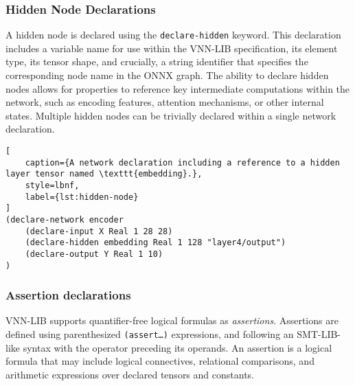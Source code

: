 \subsubsection*{Hidden Node Declarations}
\label{sec:hidden-node-declarations}
A hidden node is declared using the \texttt{declare-hidden} keyword. This declaration includes a variable name for use within the VNN-LIB specification, 
its element type, its tensor shape, and crucially, a string identifier that specifies the corresponding node name in the ONNX graph. The ability to declare hidden nodes
allows for properties to reference key intermediate computations within the network, such as encoding features, attention mechanisms, or other internal states. Multiple
hidden nodes can be trivially declared within a single network declaration.

\begin{lstlisting}[
    caption={A network declaration including a reference to a hidden layer tensor named \texttt{embedding}.}, 
    style=lbnf,
    label={lst:hidden-node}
]
(declare-network encoder
    (declare-input X Real 1 28 28)
    (declare-hidden embedding Real 1 128 "layer4/output")
    (declare-output Y Real 1 10)
)
\end{lstlisting}

\subsubsection*{Assertion declarations}
\label{sec:assertion-declarations}
VNN-LIB supports quantifier-free logical formulas as \textit{assertions}. Assertions are defined using parenthesized \texttt{(assert\ldots)} expressions, and following an SMT-LIB-like syntax with the 
operator preceding its operands. An assertion is a logical formula that may include logical connectives, relational comparisons, and arithmetic expressions over declared tensors and constants.

